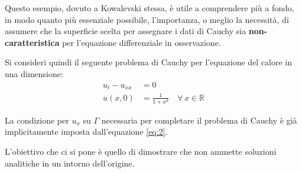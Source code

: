 \begin{example}

Questo esempio, dovuto a Kowalevski stessa, è utile a comprendere più a fondo, in modo quanto più essenziale possibile, l'importanza, o meglio la necessità, di assumere che la superficie scelta per assegnare i dati di Cauchy sia \textbf{non-caratteristica} per l'equazione differenziale in osservazione.
 
Si consideri quindi il seguente problema di Cauchy per l'equazione del calore in una dimensione:
\begin{align} 
\label{eq:1}
u_t-u_{xx}&=0\\ 
\label{eq:2}
u(x,0)&=\frac{1}{1+x^2} \quad \forall \, x \in \mathbb{R}
\end{align}
\begin{remark}
La condizione per $u_x$ su $\Gamma$ necessaria per completare il problema di Cauchy è già implicitamente imposta dall'equazione
\eqref{eq:2}.
\end{remark}
L'obiettivo che ci si pone è quello di dimostrare che non ammette soluzioni analitiche in un intorno dell'origine.


\end{example}
